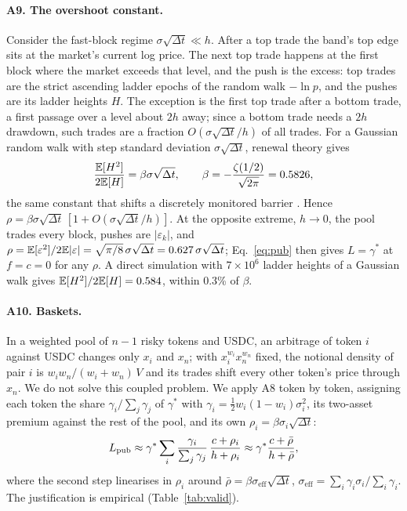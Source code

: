 \paragraph{A9. The overshoot constant.} Consider the fast-block regime $\sigma\sqrt{\Delta t}\ll h$. After a top trade the band's top edge sits at the market's current log price. The next top trade happens at the first block where the market exceeds that level, and the push is the excess: top trades are the strict ascending ladder epochs of the random walk $-\ln p$, and the pushes are its ladder heights $H$. The exception is the first top trade after a bottom trade, a first passage over a level about $2h$ away; since a bottom trade needs a $2h$ drawdown, such trades are a fraction $O(\sigma\sqrt{\Delta t}/h)$ of all trades. For a Gaussian random walk with step standard deviation $\sigma\sqrt{\Delta t}$, renewal theory gives \cite{siegmund,bgk,nt}
\begin{equation}
\frac{\mathbb{E}[H^2]}{2\mathbb{E}[H]}=\beta\sigma\sqrt{\Delta t},\qquad \beta=-\frac{\zeta(1/2)}{\sqrt{2\pi}}=0.5826,
\end{equation}
the same constant that shifts a discretely monitored barrier \cite{bgk}. Hence $\rho=\beta\sigma\sqrt{\Delta t}\,[1+O(\sigma\sqrt{\Delta t}/h)]$. At the opposite extreme, $h\to0$, the pool trades every block, pushes are $|\varepsilon_k|$, and $\rho=\mathbb{E}[\varepsilon^2]/2\mathbb{E}|\varepsilon|=\sqrt{\pi/8}\,\sigma\sqrt{\Delta t}=0.627\,\sigma\sqrt{\Delta t}$; Eq.~\eqref{eq:pub} then gives $L=\gamma^{*}$ at $f=c=0$ for any $\rho$. A direct simulation with $7\times10^{6}$ ladder heights of a Gaussian walk gives $\mathbb{E}[H^2]/2\mathbb{E}[H]=0.584$, within 0.3\% of $\beta$.

\paragraph{A10. Baskets.} In a weighted pool of $n-1$ risky tokens and USDC, an arbitrage of token $i$ against USDC changes only $x_i$ and $x_n$; with $x_i^{w_i}x_n^{w_n}$ fixed, the notional density of pair $i$ is $w_iw_n/(w_i+w_n)\,V$ and its trades shift every other token's price through $x_n$. We do not solve this coupled problem. We apply A8 token by token, assigning each token the share $\gamma_i/\sum_j\gamma_j$ of $\gamma^{*}$ with $\gamma_i=\tfrac12w_i(1-w_i)\sigma_i^2$, its two-asset premium against the rest of the pool, and its own $\rho_i=\beta\sigma_i\sqrt{\Delta t}$:
\begin{equation}
L_{\mathrm{pub}}\approx\gamma^{*}\sum_i\frac{\gamma_i}{\sum_j\gamma_j}\,\frac{c+\rho_i}{h+\rho_i}\approx\gamma^{*}\frac{c+\bar\rho}{h+\bar\rho},
\end{equation}
where the second step linearises in $\rho_i$ around $\bar\rho=\beta\sigma_{\mathrm{eff}}\sqrt{\Delta t}$, $\sigma_{\mathrm{eff}}=\sum_i\gamma_i\sigma_i/\sum_i\gamma_i$. The justification is empirical (Table~\ref{tab:valid}).

